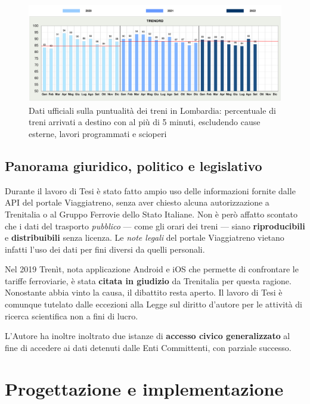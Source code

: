 \documentclass[italian]{article}
\begin{document}
\begin{figure}[t] \centering
    \includegraphics[width=1\textwidth]{images/lombardia_puntualita.png}
	\caption{Dati ufficiali sulla puntualità dei treni in Lombardia:
        percentuale di treni arrivati a destino con al più di 5
        minuti, escludendo cause esterne, lavori programmati e scioperi}
    \label{lombardia_puntualita}
\end{figure}

\subsection*{Panorama giuridico, politico e legislativo}

Durante il lavoro di Tesi è stato fatto ampio uso delle informazioni
fornite dalle API del portale Viaggiatreno, senza aver chiesto alcuna
autorizzazione a Trenitalia o al Gruppo Ferrovie dello Stato Italiane.
Non è però affatto scontato che i dati del trasporto \textit{pubblico}
--- come gli orari dei treni --- siano \textbf{riproducibili} e
\textbf{distribuibili} senza licenza.  Le \textit{note legali} del
portale Viaggiatreno vietano infatti l'uso dei dati per fini diversi
da quelli personali.

Nel 2019 Trenìt, nota applicazione Android e iOS che permette di
confrontare le tariffe ferroviarie, è stata \textbf{citata in
    giudizio} da Trenitalia per questa ragione.  Nonostante abbia
vinto la causa, il dibattito resta aperto.  Il lavoro di Tesi è
comunque tutelato dalle eccezioni alla Legge sul diritto d'autore per
le attività di ricerca scientifica non a fini di lucro.

L'Autore ha inoltre inoltrato due istanze di \textbf{accesso civico
    generalizzato} al fine di accedere ai dati detenuti dalle
Enti Committenti, con parziale successo.

\section{Progettazione e implementazione}
\end{document}
